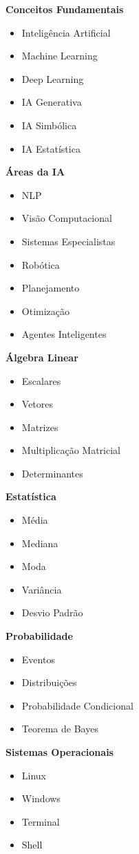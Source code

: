 \textbf{Conceitos Fundamentais}
\begin{itemize}
    \item Inteligência Artificial
    \item Machine Learning
    \item Deep Learning
    \item IA Generativa
    \item IA Simbólica
    \item IA Estatística
\end{itemize}

\textbf{Áreas da IA}
\begin{itemize}
    \item NLP
    \item Visão Computacional
    \item Sistemas Especialistas
    \item Robótica
    \item Planejamento
    \item Otimização
    \item Agentes Inteligentes
\end{itemize}

\textbf{Álgebra Linear}
\begin{itemize}
    \item Escalares
    \item Vetores
    \item Matrizes
    \item Multiplicação Matricial
    \item Determinantes
\end{itemize}

\textbf{Estatística}
\begin{itemize}
    \item Média
    \item Mediana
    \item Moda
    \item Variância
    \item Desvio Padrão
\end{itemize}

\textbf{Probabilidade}
\begin{itemize}
    \item Eventos
    \item Distribuições
    \item Probabilidade Condicional
    \item Teorema de Bayes
\end{itemize}

\textbf{Sistemas Operacionais}
\begin{itemize}
    \item Linux
    \item Windows
    \item Terminal
    \item Shell
\end{itemize}

